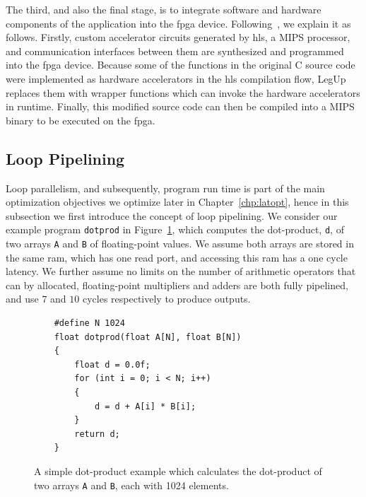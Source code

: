 The third, and also the final stage, is to integrate software and
hardware components of the application into the \gls{fpga} device.
Following~\cite{canis13}, we explain it as follows.  Firstly, custom
accelerator circuits generated by \gls{hls}, a MIPS processor, and
communication interfaces between them are synthesized and programmed into the
\gls{fpga} device.  Because some of the functions in the original C source
code were implemented as hardware accelerators in the \gls{hls} compilation
flow, LegUp replaces them with wrapper functions which can invoke the hardware
accelerators in runtime.  Finally, this modified source code can then be
compiled into a MIPS binary to be executed on the \gls{fpga}\@.


\subsection{Loop Pipelining}
\label{bg:sub:pipelining}

Loop parallelism, and subsequently, program run time is part of the main
optimization objectives we optimize later in Chapter~\ref{chp:latopt}, hence in
this subsection we first introduce the concept of loop pipelining.  We consider
our example program \verb|dotprod| in Figure~\ref{bg:lst:dotprod}, which
computes the dot-product, \verb|d|, of two arrays \verb|A| and \verb|B| of
floating-point values.  We assume both arrays are stored in the same \gls{ram},
which has one read port, and accessing this \gls{ram} has a one cycle latency.
We further assume no limits on the number of arithmetic operators that can by
allocated, floating-point multipliers and adders are both fully pipelined, and
use $7$ and $10$ cycles respectively to produce outputs.
\begin{figure}[ht]
    \centering
    \begin{minipage}{0.7\textwidth}
    \begin{lstlisting}
    #define N 1024
    float dotprod(float A[N], float B[N])
    {
        float d = 0.0f;
        for (int i = 0; i < N; i++)
        {
            d = d + A[i] * B[i];
        }
        return d;
    }
    \end{lstlisting}
    \end{minipage}
    \caption{%
        A simple dot-product example which calculates the dot-product of two
        arrays \texttt{A} and \texttt{B}, each with 1024 elements.
    }\label{bg:lst:dotprod}
\end{figure}

